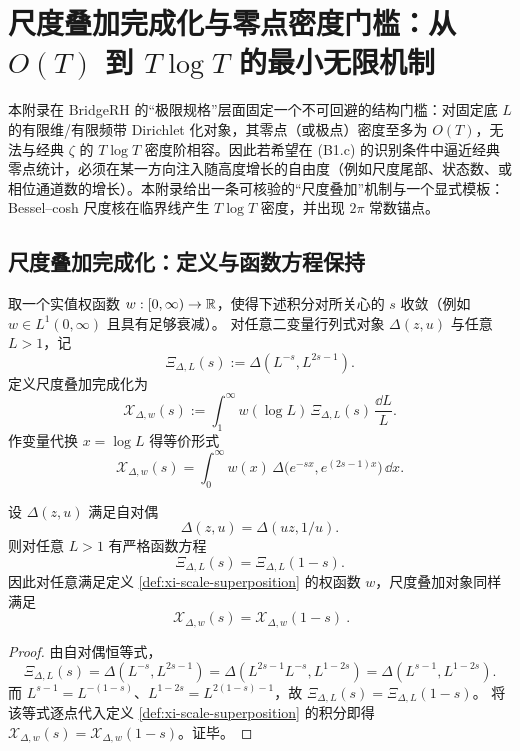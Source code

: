 \section{尺度叠加完成化与零点密度门槛：从 \texorpdfstring{$O(T)$}{O(T)} 到 \texorpdfstring{$T\log T$}{TlogT} 的最小无限机制}\label{app:scale-superposition-density}
本附录在 BridgeRH 的“极限规格”层面固定一个不可回避的结构门槛：对固定底 $L$ 的有限维/有限频带 Dirichlet 化对象，其零点（或极点）密度至多为 $O(T)$，无法与经典 $\zeta$ 的 $T\log T$ 密度阶相容。因此若希望在 (B1.c) 的识别条件中逼近经典零点统计，必须在某一方向注入随高度增长的自由度（例如尺度尾部、状态数、或相位通道数的增长）。本附录给出一条可核验的“尺度叠加”机制与一个显式模板：Bessel--cosh 尺度核在临界线产生 $T\log T$ 密度，并出现 $2\pi$ 常数锚点。

\subsection{尺度叠加完成化：定义与函数方程保持}\label{subsec:scale-superposition}

\begin{definition}[尺度叠加完成化]\label{def:xi-scale-superposition}
取一个实值权函数 $w:[0,\infty)\to\mathbb{R}$，使得下述积分对所关心的 $s$ 收敛（例如 $w\in L^1(0,\infty)$ 且具有足够衰减）。
对任意二变量行列式对象 $\Delta(z,u)$ 与任意 $L>1$，记
$$
\Xi_{\Delta,L}(s):=\Delta(L^{-s},L^{2s-1}).
$$
定义尺度叠加完成化为
$$
\mathcal X_{\Delta,w}(s):=\int_{1}^{\infty} w(\log L)\,\Xi_{\Delta,L}(s)\,\frac{\dd L}{L}.
$$
作变量代换 $x=\log L$ 得等价形式
$$
\mathcal X_{\Delta,w}(s)=\int_0^\infty w(x)\,\Delta\!\bigl(e^{-sx},e^{(2s-1)x}\bigr)\,\dd x.
$$
\end{definition}

\begin{proposition}[尺度叠加保持函数方程]\label{prop:xi-scale-superposition-fe}
设 $\Delta(z,u)$ 满足自对偶
$$
\Delta(z,u)=\Delta(uz,1/u).
$$
则对任意 $L>1$ 有严格函数方程
$$
\Xi_{\Delta,L}(s)=\Xi_{\Delta,L}(1-s).
$$
因此对任意满足定义 \ref{def:xi-scale-superposition} 的权函数 $w$，尺度叠加对象同样满足
$$
\boxed{\ \mathcal X_{\Delta,w}(s)=\mathcal X_{\Delta,w}(1-s)\ }.
$$
\end{proposition}
\begin{proof}
由自对偶恒等式，
$$
\Xi_{\Delta,L}(s)=\Delta(L^{-s},L^{2s-1})
=\Delta(L^{2s-1}L^{-s},L^{1-2s})
=\Delta(L^{s-1},L^{1-2s}).
$$
而 $L^{s-1}=L^{-(1-s)}$、$L^{1-2s}=L^{2(1-s)-1}$，故 $\Xi_{\Delta,L}(s)=\Xi_{\Delta,L}(1-s)$。
将该等式逐点代入定义 \ref{def:xi-scale-superposition} 的积分即得 $\mathcal X_{\Delta,w}(s)=\mathcal X_{\Delta,w}(1-s)$。证毕。
\end{proof}

